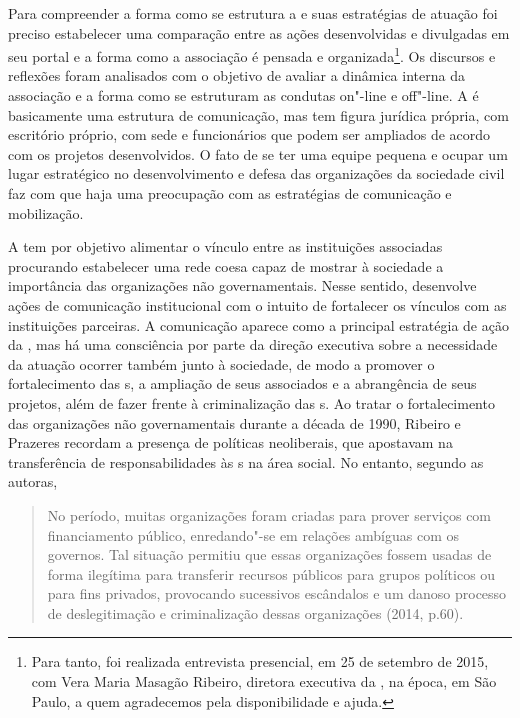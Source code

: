 Para compreender a forma como se estrutura a  e suas estratégias de
atuação foi preciso estabelecer uma comparação entre as ações
desenvolvidas e divulgadas em seu portal e a forma como a associação é
pensada e organizada\footnote{Para tanto, foi realizada entrevista
  presencial, em 25 de setembro de 2015, com Vera Maria Masagão Ribeiro,
  diretora executiva da , na época, em São Paulo, a quem
  agradecemos pela disponibilidade e ajuda.}. Os discursos e reflexões
foram analisados com o objetivo de avaliar a dinâmica interna da
associação e a forma como se estruturam as condutas on"-line e off"-line.
A  é basicamente uma estrutura de comunicação, mas tem figura
jurídica própria, com escritório próprio, com sede e funcionários que
podem ser ampliados de acordo com os projetos desenvolvidos. O fato de
se ter uma equipe pequena e ocupar um lugar estratégico no
desenvolvimento e defesa das organizações da sociedade civil faz com que
haja uma preocupação com as estratégias de comunicação e mobilização.

A  tem por objetivo alimentar o vínculo entre as instituições
associadas procurando estabelecer uma rede coesa capaz de mostrar à
sociedade a importância das organizações não governamentais. Nesse
sentido, desenvolve ações de comunicação institucional com o intuito de
fortalecer os vínculos com as instituições parceiras. A comunicação
aparece como a principal estratégia de ação da , mas há uma
consciência por parte da direção executiva sobre a necessidade da
atuação ocorrer também junto à sociedade, de modo a promover o
fortalecimento das s, a ampliação de seus associados e a abrangência
de seus projetos, além de fazer frente à criminalização das s. Ao
tratar o fortalecimento das organizações não governamentais durante a
década de 1990, Ribeiro e Prazeres recordam a presença de políticas
neoliberais, que apostavam na transferência de responsabilidades às s
na área social. No entanto, segundo as autoras,

\begin{quote}
No período, muitas organizações foram criadas para prover serviços com
financiamento público, enredando"-se em relações ambíguas com os
governos. Tal situação permitiu que essas organizações fossem usadas de
forma ilegítima para transferir recursos públicos para grupos políticos
ou para fins privados, provocando sucessivos escândalos e um danoso
processo de deslegitimação e criminalização dessas organizações (2014,
p.60).
\end{quote}

